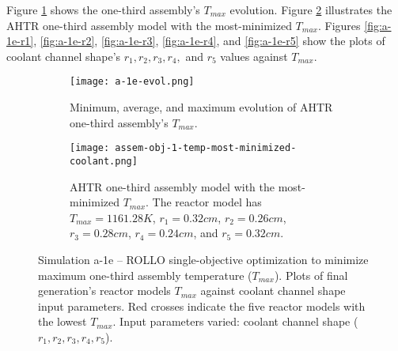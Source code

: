 Figure \ref{fig:a-1e-evol} shows the one-third assembly's $T_{max}$ evolution.
Figure \ref{fig:assem-obj-1-temp-most-minimized-coolant} illustrates the \gls{AHTR} 
one-third assembly model with the most-minimized $T_{max}$. 
Figures \ref{fig:a-1e-r1}, \ref{fig:a-1e-r2}, \ref{fig:a-1e-r3}, \ref{fig:a-1e-r4}, 
and \ref{fig:a-1e-r5} show the plots of coolant channel shape's 
$r_1, r_2, r_3, r_4,$ and $r_5$ values against $T_{max}$. 
\begin{figure}[htbp!]
    \begin{subfigure}{\textwidth}
        \centering
        \texttt{[image: a-1e-evol.png]}
        \caption{Minimum, average, and maximum evolution of AHTR one-third assembly's 
        $T_{max}$.}
        \label{fig:a-1e-evol} 
    \end{subfigure}
    \begin{subfigure}{\textwidth}
        \centering
        \texttt{[image: assem-obj-1-temp-most-minimized-coolant.png]}
        \caption{\gls{AHTR} one-third assembly model with the most-minimized $T_{max}$. 
        The reactor model has $T_{max} = 1161.28K$, $r_1 = 0.32cm$, $r_{2} = 0.26cm$,
        $r_3 = 0.28cm$, $r_{4} = 0.24cm$, and $r_{5} = 0.32cm$.}
        \label{fig:assem-obj-1-temp-most-minimized-coolant} 
    \end{subfigure}
    \caption{Simulation a-1e -- ROLLO single-objective optimization to minimize 
    maximum one-third assembly temperature ($T_{max}$). 
    Plots of final generation's reactor models $T_{max}$ against 
    coolant channel shape input parameters. 
    Red crosses indicate the five reactor models with the lowest $T_{max}$.
    Input parameters varied: coolant channel shape ($r_1, r_2, r_3, r_4, r_5$).}
    \label{fig:a-1e}
\end{figure}

